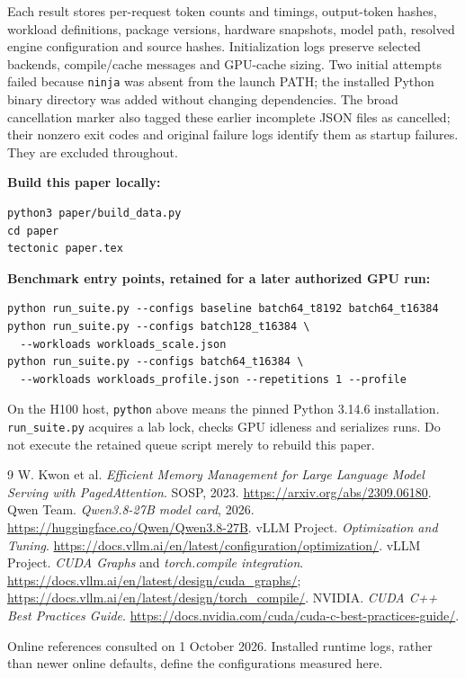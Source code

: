 \documentclass[10pt,a4paper]{article}
\newcommand{\code}[1]{\texttt{\small #1}}
\begin{document}
Each result stores per-request token counts and timings, output-token hashes,
workload definitions, package versions, hardware snapshots, model path, resolved
engine configuration and source hashes. Initialization logs preserve selected
backends, compile/cache messages and GPU-cache sizing. Two initial attempts
failed because \code{ninja} was absent from the launch PATH; the installed Python
binary directory was added without changing dependencies. The broad cancellation
marker also tagged these earlier incomplete JSON files as cancelled; their
nonzero exit codes and original failure logs identify them as startup failures.
They are excluded throughout.

\textbf{Build this paper locally:}
\begin{verbatim}
python3 paper/build_data.py
cd paper
tectonic paper.tex
\end{verbatim}

\textbf{Benchmark entry points, retained for a later authorized GPU run:}
\begin{verbatim}
python run_suite.py --configs baseline batch64_t8192 batch64_t16384
python run_suite.py --configs batch128_t16384 \
  --workloads workloads_scale.json
python run_suite.py --configs batch64_t16384 \
  --workloads workloads_profile.json --repetitions 1 --profile
\end{verbatim}
On the H100 host, \code{python} above means the pinned Python 3.14.6 installation.
\code{run\_suite.py} acquires a lab lock, checks GPU idleness and serializes runs.
Do not execute the retained queue script merely to rebuild this paper.

\begin{thebibliography}{9}\small
{} W. Kwon et al.
\emph{Efficient Memory Management for Large Language Model Serving with
PagedAttention}. SOSP, 2023. \url{https://arxiv.org/abs/2309.06180}.
\bibitem{qwen} Qwen Team. \emph{Qwen3.8-27B model card}, 2026.
\url{https://huggingface.co/Qwen/Qwen3.8-27B}.
\bibitem{vllmopt} vLLM Project. \emph{Optimization and Tuning}.
\url{https://docs.vllm.ai/en/latest/configuration/optimization/}.
\bibitem{vllmgraphs} vLLM Project. \emph{CUDA Graphs} and
\emph{torch.compile integration}.
\url{https://docs.vllm.ai/en/latest/design/cuda_graphs/};
\url{https://docs.vllm.ai/en/latest/design/torch_compile/}.
\bibitem{cuda} NVIDIA. \emph{CUDA C++ Best Practices Guide}.
\url{https://docs.nvidia.com/cuda/cuda-c-best-practices-guide/}.
\end{thebibliography}
\small Online references consulted on 1 October 2026. Installed runtime logs,
rather than newer online defaults, define the configurations measured here.
\end{document}
